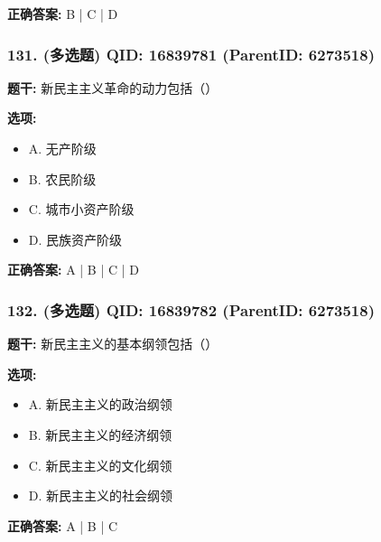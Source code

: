 \documentclass[12pt,UTF8]{ctexart}
\begin{document}
\textbf{正确答案:}
B | C | D

\vspace{0.3em}\hrulefill\vspace{0.7em}

\subsubsection*{131. (多选题) \small QID: 16839781 (ParentID: 6273518)}

\textbf{题干:}
新民主主义革命的动力包括（）



\textbf{选项:}
\begin{itemize}[leftmargin=*]

  \item A. 无产阶级

  \item B. 农民阶级

  \item C. 城市小资产阶级

  \item D. 民族资产阶级

\end{itemize}

\textbf{正确答案:}
A | B | C | D

\vspace{0.3em}\hrulefill\vspace{0.7em}

\subsubsection*{132. (多选题) \small QID: 16839782 (ParentID: 6273518)}

\textbf{题干:}
新民主主义的基本纲领包括（）



\textbf{选项:}
\begin{itemize}[leftmargin=*]

  \item A. 新民主主义的政治纲领

  \item B. 新民主主义的经济纲领

  \item C. 新民主主义的文化纲领

  \item D. 新民主主义的社会纲领

\end{itemize}

\textbf{正确答案:}
A | B | C
\end{document}
